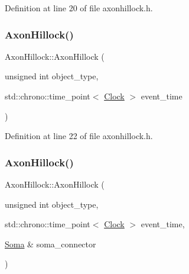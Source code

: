 Definition at line 20 of file axonhillock.\+h.

\mbox{\label{class_axon_hillock_acc61c61c8dfddd603e868a2fcbfd5e9c}} 
\subsubsection{\texorpdfstring{Axon\+Hillock()}{AxonHillock()}\hspace{0.1cm}{\footnotesize\ttfamily [3/4]}}
{\footnotesize\ttfamily Axon\+Hillock\+::\+Axon\+Hillock (\begin{DoxyParamCaption}\item[{unsigned int}]{object\+\_\+type,  }\item[{std\+::chrono\+::time\+\_\+point$<$ \hyperlink{universe_8h_a0ef8d951d1ca5ab3cfaf7ab4c7a6fd80}{Clock} $>$}]{event\+\_\+time }\end{DoxyParamCaption})\hspace{0.3cm}{\ttfamily [inline]}}



Definition at line 22 of file axonhillock.\+h.

\mbox{\label{class_axon_hillock_a250945e24a51475369b6c7881c0d955b}} 
\subsubsection{\texorpdfstring{Axon\+Hillock()}{AxonHillock()}\hspace{0.1cm}{\footnotesize\ttfamily [4/4]}}
{\footnotesize\ttfamily Axon\+Hillock\+::\+Axon\+Hillock (\begin{DoxyParamCaption}\item[{unsigned int}]{object\+\_\+type,  }\item[{std\+::chrono\+::time\+\_\+point$<$ \hyperlink{universe_8h_a0ef8d951d1ca5ab3cfaf7ab4c7a6fd80}{Clock} $>$}]{event\+\_\+time,  }\item[{\hyperlink{class_soma}{Soma} \&}]{soma\+\_\+connector }\end{DoxyParamCaption})\hspace{0.3cm}{\ttfamily [inline]}}



